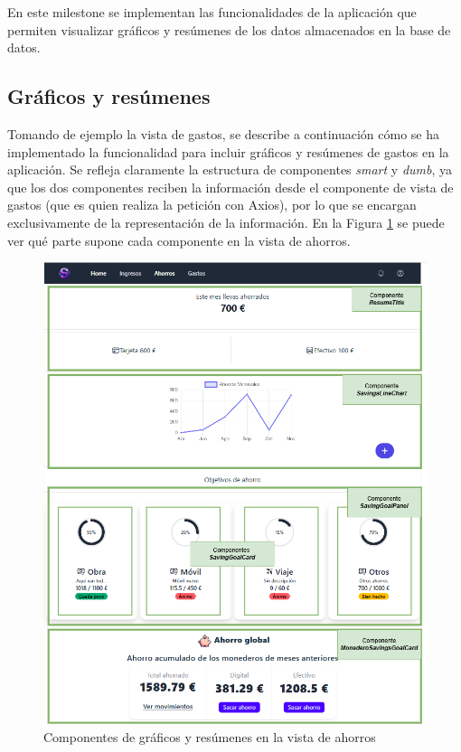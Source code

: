 En este milestone se implementan las funcionalidades de la aplicación que permiten visualizar gráficos y resúmenes de los datos almacenados en la base de datos.

\subsection{Gráficos y resúmenes}
Tomando de ejemplo la vista de gastos, se describe a continuación cómo se ha implementado la funcionalidad para incluir gráficos y resúmenes de gastos en la aplicación. Se refleja claramente la estructura de componentes \textit{smart} y \textit{dumb}, ya que los dos componentes reciben la información desde el componente de vista de gastos (que es quien realiza la petición con Axios), por lo que se encargan exclusivamente de la representación de la información\cite{khan2023reactjs}. En la Figura \ref{fig:componentes_graficos_resumenes} se puede ver qué parte supone cada componente en la vista de ahorros.

\begin{figure}[ht!]
    \centering
    \includegraphics[width=\linewidth]{imagenes/componente-graficos-resumenes.drawio.png}
    \caption{Componentes de gráficos y resúmenes en la vista de ahorros}
    \label{fig:componentes_graficos_resumenes}
\end{figure}


